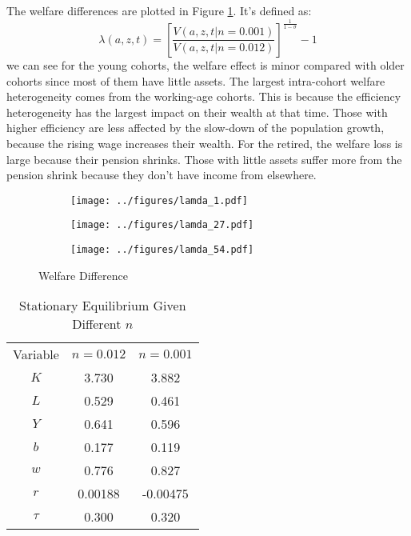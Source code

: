 \documentclass{article}
\begin{document}
	The welfare differences are plotted in Figure \ref{fig:lamda}.
	It's defined as:
	\begin{equation}
		\lambda(a,z,t)=\left[ \frac{V(a,z,t|n=0.001)}{V(a,z,t|n=0.012)} \right]^{\frac{1}{1-\sigma}}- 1
	\end{equation}
	we can see for the young cohorts, the welfare effect is minor compared with older cohorts since most of them have little assets.
	The largest intra-cohort welfare heterogeneity comes from the working-age cohorts.
	This is because the efficiency heterogeneity has the largest impact on their wealth at that time.
	Those with higher efficiency are less affected by the slow-down of the population growth, because the rising wage increases their wealth.
	For the retired, the welfare loss is large because their pension shrinks.
	Those with little assets suffer more from the pension shrink because they don't have income from elsewhere.
	\begin{figure}[h]
		\centering
		\begin{subfigure}{0.32\textwidth}
			\texttt{[image: ../figures/lamda\_1.pdf]}
		\end{subfigure}
		\begin{subfigure}{0.32\textwidth}
			\texttt{[image: ../figures/lamda\_27.pdf]}
		\end{subfigure}
		\begin{subfigure}{0.32\textwidth}
			\texttt{[image: ../figures/lamda\_54.pdf]}
		\end{subfigure}
		\caption{Welfare Difference}
		\label{fig:lamda}
	\end{figure}
	
	\begin{table}[h]
		\centering
		\begin{tabular}{c|c|c}
			Variable & $n=0.012$ & $n=0.001$ \\
			$K$ & 3.730 & 3.882\\
			$L$ & 0.529 & 0.461\\
			$Y$ & 0.641 & 0.596\\
			$b$ & 0.177 & 0.119\\
			$w$ & 0.776 & 0.827\\
			$r$ & 0.00188 & -0.00475\\
			$\tau$ & 0.300 & 0.320\\
		\end{tabular}
		\caption{Stationary Equilibrium Given Different $n$}
		\label{tab:se2}
	\end{table}
	
\end{document}
